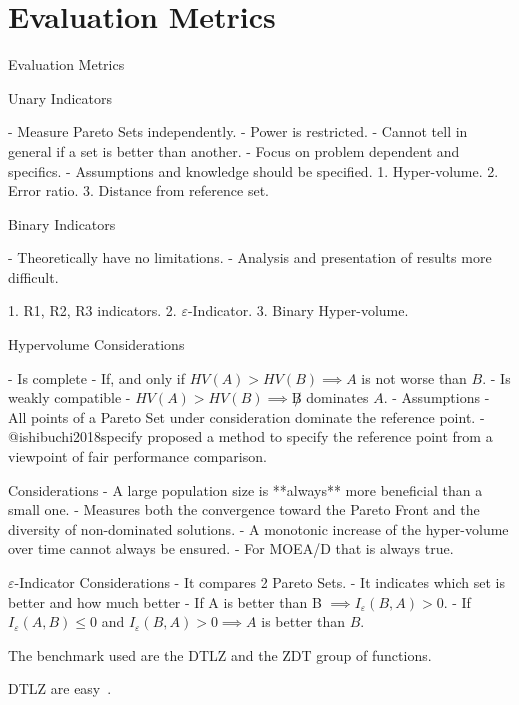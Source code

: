 \section{Evaluation Metrics}

Evaluation Metrics

Unary Indicators

- Measure Pareto Sets independently.
- Power is restricted.
- Cannot tell in general if a set is better than another.
- Focus on problem dependent and specifics.
- Assumptions and knowledge should be specified.
1. Hyper-volume.
2. Error ratio.
3. Distance from reference set.

Binary Indicators

- Theoretically have no limitations.
- Analysis and presentation of results more difficult.

1. R1, R2, R3 indicators.
2. $\varepsilon$-Indicator.
3. Binary Hyper-volume.

Hypervolume
Considerations

- Is complete - If, and only if $HV(A) > HV(B) \implies A$ is not worse than $B$.
- Is weakly compatible - $HV(A) > HV(B) \implies \not B$ dominates $A$.
- Assumptions - All points of a Pareto Set under consideration dominate the reference point.
- @ishibuchi2018specify proposed a method to specify the reference point from a viewpoint of fair performance comparison.

 Considerations
- A large population size is **always** more beneficial than a small one.
- Measures both the convergence toward the Pareto Front and the diversity of non-dominated solutions.
- A monotonic increase of the hyper-volume over time cannot always be ensured.
- For MOEA/D that is always true.

$\varepsilon$-Indicator
Considerations
- It compares 2 Pareto Sets.
- It indicates which set is better and how much better
- If A is better than B $\implies I_{\varepsilon}(B,A) > 0$.
- If $I_{\varepsilon}(A,B) \leq 0$ and $I_{\varepsilon}(B,A) > 0 \implies A$ is better than $B$.

The benchmark used are the DTLZ and the ZDT group of functions.

DTLZ are easy~\cite{bezerra2015comparing}.